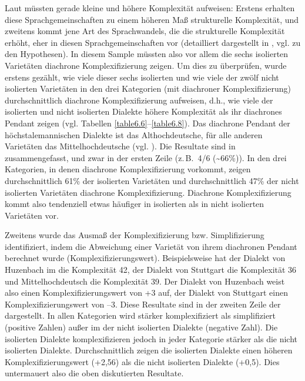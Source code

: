 Laut \citet{Trudgill2011} müssten gerade kleine und  höhere Komplexität aufweisen: Erstens erhalten diese Sprachgemeinschaften zu einem höheren Maß strukturelle Komplexität, und zweitens kommt jene Art des Sprachwandels, die die strukturelle Komplexität erhöht, eher in diesen Sprachgemeinschaften vor (detailliert dargestellt in , vgl.  zu den Hypothesen). In diesem Sample müssten also vor allem die sechs isolierten Varietäten diachrone Komplexifizierung zeigen. Um dies zu überprüfen, wurde erstens gezählt, wie viele dieser sechs isolierten und wie viele der zwölf nicht isolierten Varietäten in den drei Kategorien (mit diachroner Komplexifizierung) durchschnittlich diachrone Komplexifizierung aufweisen, d.h., wie viele der isolierten und nicht isolierten Dialekte höhere Komplexität als ihr diachrones Pendant zeigen (vgl. Tabellen \ref{table6.6}–\ref{table6.8}). Das diachrone Pendant der höchstalemannischen Dialekte ist das Althochdeutsche, für alle anderen Varietäten das Mittelhochdeutsche (vgl. ). Die Resultate sind in  zusammengefasst, und zwar in der ersten Zeile (z.\,B.\ 4/6 ({\textasciitilde}66\%)). In den drei Kategorien, in denen diachrone Komplexifizierung vorkommt, zeigen durchschnittlich 61\% der isolierten Varietäten und durchschnittlich 47\% der nicht isolierten Varietäten diachrone Komplexifizierung. Diachrone Komplexifizierung kommt also tendenziell etwas häufiger in isolierten als in nicht isolierten Varietäten vor.

Zweitens wurde das Ausmaß der Komplexifizierung bzw. Simplifizierung identifiziert, indem die Abweichung einer Varietät von ihrem diachronen Pendant berechnet wurde (Komplexifizierungswert). Beispielsweise hat der Dialekt von Huzenbach im  die Komplexität 42, der Dialekt von Stuttgart die Komplexität 36 und Mittelhochdeutsch die Komplexität 39. Der Dialekt von Huzenbach weist also einen Komplexifizierungswert von +3 auf, der Dialekt von Stuttgart einen Komplexifizierungswert von –3. Diese Resultate sind in der zweiten Zeile der  dargestellt. In allen Kategorien wird stärker komplexifiziert als simplifiziert (positive Zahlen) außer im  der nicht isolierten Dialekte (negative Zahl). Die isolierten Dialekte komplexifizieren jedoch in jeder Kategorie stärker als die nicht isolierten Dialekte. Durchschnittlich zeigen die isolierten Dialekte einen höheren Komplexifizierungswert (+2,56) als die nicht isolierten Dialekte (+0,5). Dies untermauert also die oben diskutierten Resultate.

